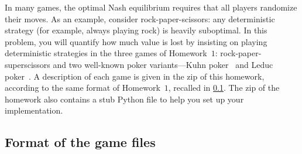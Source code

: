 \documentclass{homework}
\begin{document}
In many games, the optimal Nash equilibrium requires that all players randomize their moves. As an example, consider rock-paper-scissors: any deterministic strategy (for example, always playing rock) is heavily suboptimal. In this problem, you will quantify how much value is lost by insisting on playing deterministic strategies in the three games of Homework~$1$: rock-paper-superscissors and two well-known poker variants---Kuhn poker~\citep{Kuhn50:Simplified} and Leduc poker~\citep{Southey05:Bayes}. A description of each game is given in the zip of this homework, according to the same format of Homework~$1$, recalled in \cref{sec:format}. The zip of the homework also contains a stub Python file to help you set up your implementation. 

\subsection{Format of the game files}\label{sec:format}
\end{document}
